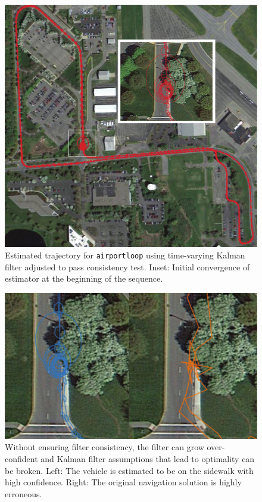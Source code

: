 \begin{figure}[!bthp]
\includegraphics[width=\columnwidth]{airportloop_map}
\caption{Estimated trajectory for \texttt{airportloop} using time-varying Kalman filter adjusted to pass consistency test.  Inset: Initial convergence of estimator at the beginning of the sequence.}
\label{fig:airportloop_map}
\end{figure} 

\begin{figure}
\includegraphics[width=\columnwidth]{airportloop_map_bad}
\caption{Without ensuring filter consistency, the filter can grow over-confident and Kalman filter assumptions that lead to optimality can be broken.  Left: The vehicle is estimated to be on the sidewalk with high confidence.  Right: The original navigation solution is highly erroneous.}
\label{fig:airportloop_map_bad}
\end{figure}

